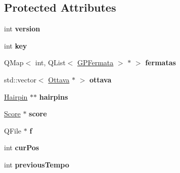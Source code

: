 \subsection*{Protected Attributes}
\begin{DoxyCompactItemize}
\item 
\mbox{\label{class_ms_1_1_guitar_pro_ae42e7785b705834d9785f14b0aa2213a}} 
int {\bfseries version}
\item 
\mbox{\label{class_ms_1_1_guitar_pro_ae468c993cd97caa4d9b04fdf6628a4b3}} 
int {\bfseries key}
\item 
\mbox{\label{class_ms_1_1_guitar_pro_a4ef414df904a8cbeb7b396d62b322241}} 
Q\+Map$<$ int, Q\+List$<$ \hyperlink{struct_ms_1_1_g_p_fermata}{G\+P\+Fermata} $>$ $\ast$ $>$ {\bfseries fermatas}
\item 
\mbox{\label{class_ms_1_1_guitar_pro_ab5ac73e194c9c6798447695c57c92947}} 
std\+::vector$<$ \hyperlink{class_ms_1_1_ottava}{Ottava} $\ast$ $>$ {\bfseries ottava}
\item 
\mbox{\label{class_ms_1_1_guitar_pro_aea178d81ea1ff214223dcd918031af57}} 
\hyperlink{class_ms_1_1_hairpin}{Hairpin} $\ast$$\ast$ {\bfseries hairpins}
\item 
\mbox{\label{class_ms_1_1_guitar_pro_ad513362508daf74cfc96e33eeb36c7f8}} 
\hyperlink{class_ms_1_1_score}{Score} $\ast$ {\bfseries score}
\item 
\mbox{\label{class_ms_1_1_guitar_pro_a656039bf1a898da309e8c0b5a6846b2e}} 
Q\+File $\ast$ {\bfseries f}
\item 
\mbox{\label{class_ms_1_1_guitar_pro_a8a66ba8f3806f011e0a9d9e43e8e1b85}} 
int {\bfseries cur\+Pos}
\item 
\mbox{\label{class_ms_1_1_guitar_pro_a4ba0f6bc282f959cca5971c0f537c688}} 
int {\bfseries previous\+Tempo}
\item 
\mbox{\label{class_ms_1_1_guitar_pro_a44cdd593903965ef19564b841f14838f}} 
$$
\end{DoxyCompactItemize}

